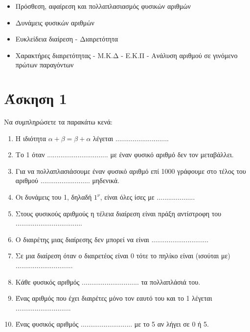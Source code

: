 \documentclass[a4paper,10pt]{report}
\begin{document}
\vspace{2em}
\begin{itemize}
\item Πρόσθεση, αφαίρεση και πολλαπλασιασμός φυσικών αριθμών
\item Δυνάμεις φυσικών αριθμών
\item Ευκλείδεια διαίρεση - Διαιρετότητα
\item Χαρακτήρες διαιρετότητας - Μ.Κ.Δ - Ε.Κ.Π - Ανάλυση αριθμού σε γινόμενο πρώτων παραγόντων
\end{itemize}


\section*{Άσκηση 1  \hfill \small{}}
Να συμπληρώσετε τα παρακάτω κενά:
\begin{enumerate}[1)]
 \item Η ιδιότητα $α+β=β+α$ λέγεται ............................
 \item Το 1 όταν ................................ με έναν φυσικό αριθμό δεν τον μεταβάλλει.
 \item Για να πολλαπλασιάσουμε έναν φυσικό αριθμό επί 1000 γράφουμε στο τέλος του αριθμού ..........................
       μηδενικά.
 \item Οι δυνάμεις του 1, δηλαδή $1^{ν}$, είναι όλες ίσες με ....................
 \item Στους φυσικούς αριθμούς η τέλεια διαίρεση είναι πράξη αντίστροφη του ...................................
 \item Ο διαιρέτης μιας διαίρεσης δεν μπορεί να είναι ..............................
 \item Σε μια διαίρεση όταν ο διαιρετέος είναι 0 τότε το πηλίκο είναι (ισούται με) ..............................
 \item Κάθε φυσικός αριθμός .............................. τα πολλαπλάσιά του.
 \item Ένας αριθμός που έχει διαιρέτες μόνο τον εαυτό του και το 1 λέγεται .............................
 \item Ένας φυσικός αριθμός ........................... με το 5 αν λήγει σε 0 ή 5.
\end{enumerate}
\end{document}
